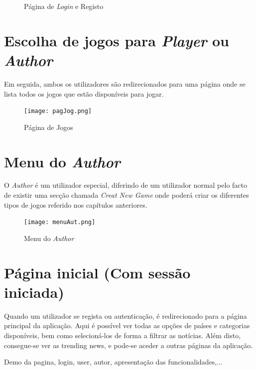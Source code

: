 \documentclass[11pt,a4paper]{report}
\begin{document}
\begin{figure}[h]%
    \centering
    \qquad
    \qquad
    \caption{Página de \emph{Login} e Registo}%
    \label{fig:log&sigUp}%
\end{figure}

\section{Escolha de jogos para \emph{Player} ou \emph{Author}}
Em seguida, ambos os utilizadores são redirecionados para uma página onde se lista todos os jogos que estão disponíveis para jogar.

\begin{figure}[h]
    \centering
    \texttt{[image: pagJog.png]}
    \caption{Página de Jogos}
    \label{fig:pagJog}
\end{figure}

\section{Menu do \emph{Author}}
O \emph{Author} é um utilizador especial, diferindo de um utilizador normal pelo facto de existir uma secção chamada \emph{Creat New Game} onde poderá criar os diferentes tipos de jogos referido nos capítulos anteriores.

\begin{figure}[h]
    \centering
    \texttt{[image: menuAut.png]}
    \caption{Menu do \emph{Author}}
    \label{fig:menuAut}
\end{figure}

\section{Página inicial (Com sessão iniciada)}

Quando um utilizador se regista ou autenticação, é redirecionado para a página principal da aplicação. Aqui é possível ver todas as opções de países e categorias disponíveis, bem como selecioná-los de forma a filtrar as notícias. Além disto, consegue-se ver as trending news, e pode-se aceder a outras páginas da aplicação.

Demo da pagina, login, user, autor, apresentação das funcionalidades,...
\end{document}
